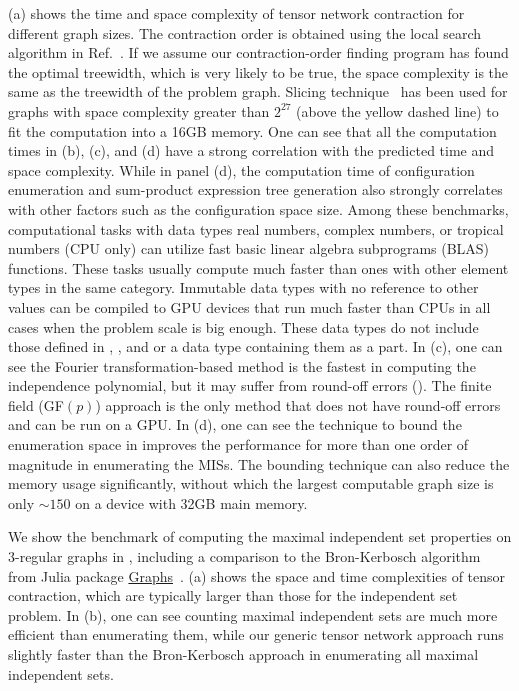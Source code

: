 \documentclass[review,supplement,onefignum,onetabnum]{siamart190516}
\begin{document}
(a) shows the time and space complexity of tensor network contraction for different graph sizes.
The contraction order is obtained using the local search algorithm in Ref.~\cite{Kalachev2021}.
If we assume our contraction-order finding program has found the optimal treewidth, which is very likely to be true, the space complexity is the same as the treewidth of the problem graph.
Slicing technique~\cite{Kalachev2021} has been used for graphs with space complexity greater than $2^{27}$ (above the yellow dashed line) to fit the computation into a 16GB memory.
One can see that all the computation times in  (b), (c), and (d) have a strong correlation with the predicted time and space complexity.
While in panel (d), the computation time of configuration enumeration and sum-product expression tree generation also strongly correlates with other factors such as the configuration space size.
Among these benchmarks, computational tasks with data types real numbers, complex numbers, or tropical numbers (CPU only) can utilize fast basic linear algebra subprograms (BLAS) functions.
These tasks usually compute much faster than ones with other element types in the same category.
Immutable data types with no reference to other values can be compiled to GPU devices that run much faster than CPUs in all cases when the problem scale is big enough.
These data types do not include those defined in , ,  and  or a data type containing them as a part.
In (c), one can see the Fourier transformation-based method is the fastest in computing the independence polynomial,
but it may suffer from round-off errors (). The finite field (GF$(p)$) approach is the only method that does not have round-off errors and can be run on a GPU.
In (d), one can see the technique to bound the enumeration space in  improves the performance for more than one order of magnitude in enumerating the MISs.
The bounding technique can also reduce the memory usage significantly, without which the largest computable graph size is only $\sim150$ on a device with 32GB main memory.

We show the benchmark of computing the maximal independent set properties on $3$-regular graphs in ,
including a comparison to the Bron-Kerbosch algorithm from Julia package \href{https://github.com/JuliaGraphs/Graphs.jl}{Graphs}~\cite{Graphs}.
(a) shows the space and time complexities of tensor contraction, which are typically larger than those for the independent set problem.
In (b), one can see counting maximal independent sets are much more efficient than enumerating them, while our generic tensor network approach runs slightly faster than the Bron-Kerbosch approach in enumerating all maximal independent sets.
\end{document}
